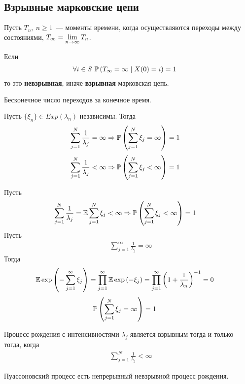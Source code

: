 \subsection{Взрывные марковские цепи}
\begin{Des}
    Пусть $T_n, \ n \geq 1$~--- моменты времени, когда осуществляются переходы
    между состояниями, $T_{\infty} = \displaystyle \lim_{n \to \infty} T_n$.
\end{Des}
\begin{Des}
    Если
    \begin{align*}
      & \forall i \in S \ \mathbb{P}\left( T_\infty = \infty \mid X(0) = i \right) = 1
    \end{align*}
    то это \textbf{невзрывная}, иначе \textbf{взрывная} марковская цепь.
\end{Des}
Бесконечное число переходов за конечное время.
\begin{theorem}
    Пусть $\{\xi_n\} \in Exp(\lambda_n)$ независимы. Тогда
    \begin{align*}
      & \sum_{j=1}^N\frac{1}{\lambda_j} = \infty \Rightarrow \mathbb{P}\left( \sum_{j=1}^N \xi_j =\infty \right) =1
    \end{align*}
    \begin{align*}
      & \sum_{j=1}^N\frac{1}{\lambda_j} < \infty \Rightarrow \mathbb{P}\left( \sum_{j=1}^N \xi_j <\infty \right) =1
    \end{align*}
\end{theorem}
\begin{Proof}
    Пусть
    \begin{align*}
      & \sum_{j=1}^N\frac{1}{\lambda_j} = \mathbb{E} \sum_{j=1}^N \xi_j < \infty \Rightarrow \mathbb{P}\left( \sum_{j=1}^N \xi_j <\infty \right) =1
    \end{align*}
    Пусть
    \begin{align*}
      & \sum_{j=1}^\infty\frac{1}{\lambda_j} = \infty
    \end{align*}
    Тогда
    \begin{align*}
      & \mathbb{E} \exp\left( -\sum_{j=1}^\infty\xi_j\right) = \prod_{j=1}^\infty \mathbb{E} \exp \left( -\xi_j \right) = \prod_{j=1}^\infty \left( 1 + \frac{1}{\lambda_n} \right)^{-1} = 0
    \end{align*}
    \begin{align*}
      & \mathbb{P}\left( \sum_{j=1}^N \xi_j =\infty \right) = 1
    \end{align*}
\end{Proof}
\begin{corollary}
    Процесс рождения с интенсивностями $\lambda_j$ является взрывным тогда и
    только тогда, когда
    \begin{align*}
      & \sum_{j=1}^N\frac{1}{\lambda_j} < \infty
    \end{align*}
\end{corollary}
\begin{Note}
    Пуассоновский процесс есть непрерывный невзрывной процесс рождения.
\end{Note}
